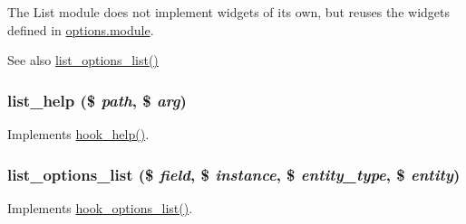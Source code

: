 The List module does not implement widgets of its own, but reuses the widgets defined in \hyperlink{options_8module}{options.module}.

\begin{DoxySeeAlso}{See also}
\hyperlink{list_8module_a3f9af78b260cdcf9c3a2f44df102e7e4}{list\_\-options\_\-list()} 
\end{DoxySeeAlso}
\hypertarget{list_8module_a46b480544753f929da4823a51ec5693e}{
\subsubsection[{list\_\-help}]{\setlength{\rightskip}{0pt plus 5cm}list\_\-help (\$ {\em path}, \/  \$ {\em arg})}}
\label{list_8module_a46b480544753f929da4823a51ec5693e}
Implements \hyperlink{group__hooks_ga5589c2714a782738e8851c4c90231f0e}{hook\_\-help()}. \hypertarget{list_8module_a3f9af78b260cdcf9c3a2f44df102e7e4}{
\subsubsection[{list\_\-options\_\-list}]{\setlength{\rightskip}{0pt plus 5cm}list\_\-options\_\-list (\$ {\em field}, \/  \$ {\em instance}, \/  \$ {\em entity\_\-type}, \/  \$ {\em entity})}}
\label{list_8module_a3f9af78b260cdcf9c3a2f44df102e7e4}
Implements \hyperlink{options_8api_8php_aa25d7440810f3dc0c137ef0e5747b485}{hook\_\-options\_\-list()}. 